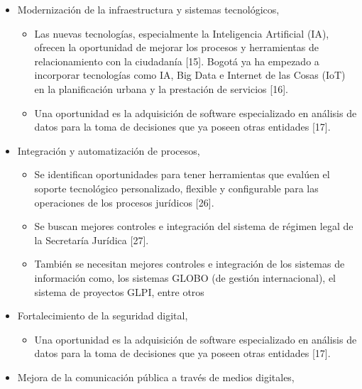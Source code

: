 \documentclass[
	a4paper, %
	12pt, %
]{include/CSSullivanBusinessReport}
\def\tightlist{}
\begin{document}
\begin{itemize}
\item
  Modernización de la infraestructura y sistemas tecnológicos,

  \begin{itemize}
  \tightlist
  \item
    Las nuevas tecnologías, especialmente la Inteligencia Artificial
    (IA), ofrecen la oportunidad de mejorar los procesos y herramientas
    de relacionamiento con la ciudadanía {[}15{]}. Bogotá ya ha empezado
    a incorporar tecnologías como IA, Big Data e Internet de las Cosas
    (IoT) en la planificación urbana y la prestación de servicios
    {[}16{]}.
  \item
    Una oportunidad es la adquisición de software especializado en
    análisis de datos para la toma de decisiones que ya poseen otras
    entidades {[}17{]}.
  \end{itemize}
\item
  Integración y automatización de procesos,

  \begin{itemize}
  \tightlist
  \item
    Se identifican oportunidades para tener herramientas que evalúen el
    soporte tecnológico personalizado, flexible y configurable para las
    operaciones de los procesos jurídicos {[}26{]}.
  \item
    Se buscan mejores controles e integración del sistema de régimen
    legal de la Secretaría Jurídica {[}27{]}.
  \item
    También se necesitan mejores controles e integración de los sistemas
    de información como, los sistemas GLOBO (de gestión internacional),
    el sistema de proyectos GLPI, entre otros
  \end{itemize}
\item
  Fortalecimiento de la seguridad digital,

  \begin{itemize}
  \tightlist
  \item
    Una oportunidad es la adquisición de software especializado en
    análisis de datos para la toma de decisiones que ya poseen otras
    entidades {[}17{]}.
  \end{itemize}
\item
  Mejora de la comunicación pública a través de medios digitales,


\end{itemize}
\end{document}
